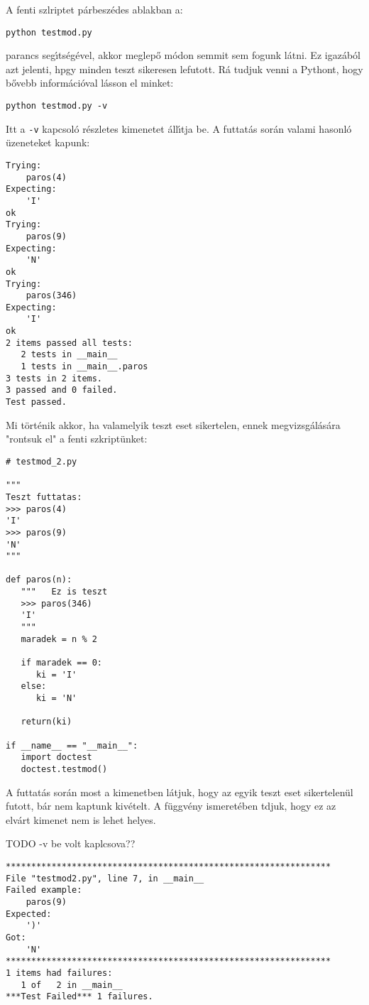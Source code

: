 A fenti szlriptet p\'arbesz\'edes ablakban a:

\begin{Verbatim}[fontsize=\small]
python testmod.py
\end{Verbatim}

\noindent parancs seg\'{\i}ts\'eg\'evel, akkor meglep\H{o} m\'odon semmit sem fogunk l\'atni. Ez igaz\'ab\'ol 
azt jelenti, hpgy minden teszt sikeresen lefutott. R\'a tudjuk venni a Pythont, hogy b\H{o}vebb inform\'aci\'oval 
l\'asson el minket:

\begin{Verbatim}[fontsize=\small]
python testmod.py -v
\end{Verbatim}

\noindent Itt a {\tt -v} kapcsol\'o r\'eszletes kimenetet \'all\'{\i}tja be. A futtat\'as sor\'an valami hasonl\'o 
\"uzeneteket kapunk:

\begin{Verbatim}[fontsize=\small]
Trying:
    paros(4)
Expecting:
    'I'
ok
Trying:
    paros(9)
Expecting:
    'N'
ok
Trying:
    paros(346)
Expecting:
    'I'
ok
2 items passed all tests:
   2 tests in __main__
   1 tests in __main__.paros
3 tests in 2 items.
3 passed and 0 failed.
Test passed.
\end{Verbatim}

Mi t\"ort\'enik akkor, ha valamelyik teszt eset sikertelen, ennek megvizsg\'al\'as\'ara "rontsuk el" a 
fenti szkript\"unket:

\begin{Verbatim}[fontsize=\small]
# testmod_2.py

"""
Teszt futtatas:
>>> paros(4)
'I'
>>> paros(9)
'N'
"""

def paros(n):
   """   Ez is teszt
   >>> paros(346)
   'I'
   """
   maradek = n % 2

   if maradek == 0:
      ki = 'I'
   else:
      ki = 'N'

   return(ki)

if __name__ == "__main__":
   import doctest
   doctest.testmod()

\end{Verbatim}

\noindent A futtat\'as sor\'an most a kimenetben l\'atjuk, hogy az egyik teszt eset sikertelen\"ul futott, 
b\'ar nem kaptunk kiv\'etelt. A f\"uggv\'eny ismeret\'eben tdjuk, hogy ez az elv\'art kimenet nem is lehet 
helyes.

TODO -v be volt kaplcsova??

\begin{Verbatim}[fontsize=\small]
****************************************************************
File "testmod2.py", line 7, in __main__
Failed example:
    paros(9)
Expected:
    ')'
Got:
    'N'
****************************************************************
1 items had failures:
   1 of   2 in __main__
***Test Failed*** 1 failures.
\end{Verbatim}

